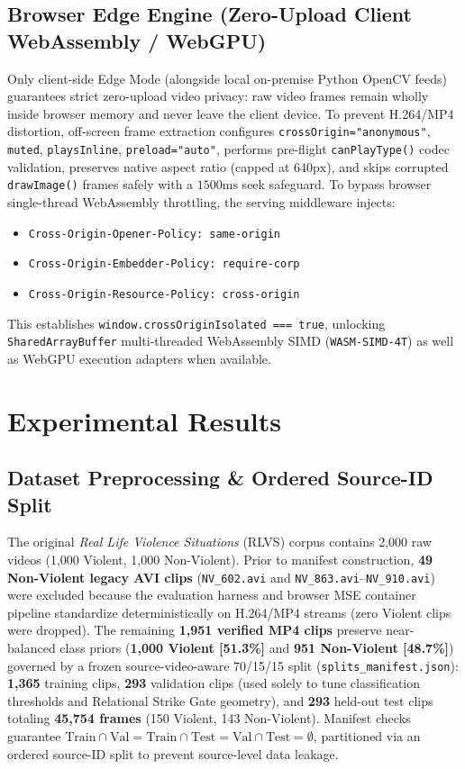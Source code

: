 \documentclass[conference]{IEEEtran}
\begin{document}
\subsection{Browser Edge Engine (Zero-Upload Client WebAssembly / WebGPU)}
Only client-side Edge Mode (alongside local on-premise Python OpenCV feeds) guarantees strict zero-upload video privacy: raw video frames remain wholly inside browser memory and never leave the client device. To prevent H.264/MP4 distortion, off-screen frame extraction configures \texttt{crossOrigin="anonymous"}, \texttt{muted}, \texttt{playsInline}, \texttt{preload="auto"}, performs pre-flight \texttt{canPlayType()} codec validation, preserves native aspect ratio (capped at $640\text{px}$), and skips corrupted \texttt{drawImage()} frames safely with a $1500\text{ms}$ seek safeguard. To bypass browser single-thread WebAssembly throttling, the serving middleware injects:
\begin{itemize}
    \item \texttt{Cross-Origin-Opener-Policy: same-origin}
    \item \texttt{Cross-Origin-Embedder-Policy: require-corp}
    \item \texttt{Cross-Origin-Resource-Policy: cross-origin}
\end{itemize}
This establishes \texttt{window.crossOriginIsolated === true}, unlocking \texttt{SharedArrayBuffer} multi-threaded WebAssembly SIMD (\texttt{WASM-SIMD-4T}) as well as WebGPU execution adapters when available.

\section{Experimental Results}

\subsection{Dataset Preprocessing \& Ordered Source-ID Split}
The original \textit{Real Life Violence Situations} (RLVS) corpus \cite{b5} contains 2,000 raw videos (1,000 Violent, 1,000 Non-Violent). Prior to manifest construction, \textbf{49 Non-Violent legacy AVI clips} (\texttt{NV\_602.avi} and \texttt{NV\_863.avi}--\texttt{NV\_910.avi}) were excluded because the evaluation harness and browser MSE container pipeline standardize deterministically on H.264/MP4 streams (zero Violent clips were dropped). The remaining \textbf{1,951 verified MP4 clips} preserve near-balanced class priors (\textbf{1,000 Violent [51.3\%]} and \textbf{951 Non-Violent [48.7\%]}) governed by a frozen source-video-aware 70/15/15 split (\texttt{splits\_manifest.json}): \textbf{1,365} training clips, \textbf{293} validation clips (used solely to tune classification thresholds and Relational Strike Gate geometry), and \textbf{293} held-out test clips totaling \textbf{45,754 frames} (150 Violent, 143 Non-Violent). Manifest checks guarantee $\text{Train} \cap \text{Val} = \text{Train} \cap \text{Test} = \text{Val} \cap \text{Test} = \emptyset$, partitioned via an ordered source-ID split to prevent source-level data leakage.
\end{document}
